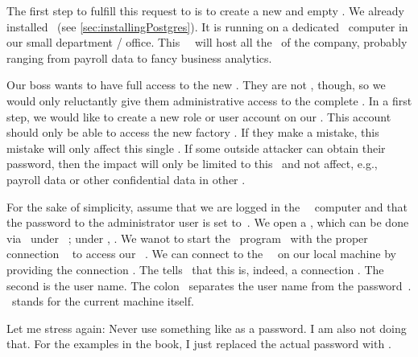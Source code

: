 %
%
%
%
%
The first step to fulfill this request to is to create a new and empty \db.
We already installed \postgresql\ (see \cref{sec:installingPostgres}).
It is running on a dedicated \server\ computer in our small  department / office.
This \db\ \server\ will host all the \dbs\ of the company, probably ranging from payroll data to fancy business analytics.

Our boss wants to have full access to the new \db.
They are not , though, so we would only reluctantly give them administrative access to the complete \server.
In a first step, we would like to create a new role or user account on our \dbms.
This account should only be able to access the new factory \db.
If they make a mistake, this mistake will only affect this single \db.
If some outside attacker can obtain their password, then the impact will only be limited to this \db\ and not affect, e.g., payroll data or other confidential data in other \dbs.

For the sake of simplicity, assume that we are logged in the \db~\server\ computer and that the password to the administrator user  is set to~.
We open a , which can be done via \ubuntuTerminal\ under \ubuntu\ \linux; under \windows, \windowsTerminal.
We wanot to start the \client\ program \psql\ with the proper connection ~\cite{PGDG:PD} to access our \postgresql\ \server.
We can connect to the \postgresql\ \server\ on our local machine by providing the connection  .
The  tells \psql\ that this is, indeed, a connection .
The second  is the user name.
The colon~\inQuotes{\textil{:}} separates the user name from the password~.
\localhost\ stands for the current machine itself.

Let me stress again:
Never use something like  as a password.
I am also not doing that.
For the examples in the book, I just replaced the actual password with .

